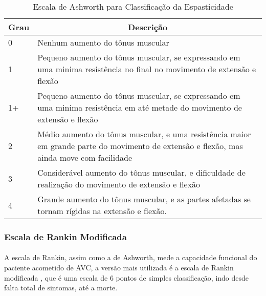 	\begin{table}[H]
		\centering
		\caption{Escala de Ashworth para Classificação da Espasticidade}
		\label{tab:ashworth}
	\begin{tabularx}{\textwidth}{|l X|}

		\hline
		\multicolumn{1}{|c}{Grau} & \multicolumn{1}{c|}{Descrição}                                                                                                            \\ \hline
		0                          & Nenhum aumento do tônus muscular                                                                                                          \\ \hline
		1                          & Pequeno aumento do tônus muscular, se expressando em uma minima resistência no final no movimento de extensão e flexão                    \\ \hline
		1+                         & Pequeno aumento do tônus muscular, se expressando em uma minima resistência em até metade do movimento de extensão e flexão               \\ \hline
		2                          & Médio aumento do tônus muscular, e uma resistência maior em grande parte do movimento de extensão e flexão, mas ainda move com facilidade \\ \hline
		3                          & Considerável aumento do tônus muscular, e dificuldade de realização do movimento de extensão e flexão                                     \\ \hline
		4                          & Grande aumento do tônus muscular, e as partes afetadas se tornam rígidas na extensão e flexão.\\ \hline
	\end{tabularx}
	\end{table}

\subsubsection{Escala de Rankin Modificada}

\paragraph{}A escala de Rankin\cite{Rankin57}, assim como a de Ashworth, mede a capacidade funcional do paciente acometido de AVC, a versão mais utilizada é a escala de Rankin modificada \cite{Swieten88}, que é uma escala de 6 pontos de simples classificação, indo desde falta total de sintomas, até a morte.

